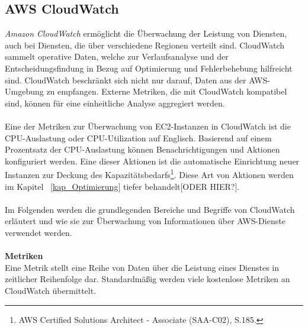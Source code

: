 \subsection{AWS CloudWatch}\label{ssec:CloudWatch}
\textit{Amazon CloudWatch} ermöglicht die Überwachung der Leistung von Diensten, auch bei Diensten, die über verschiedene Regionen verteilt sind. CloudWatch sammelt operative Daten, welche zur Verlaufsanalyse und der Entscheidungsfindung in Bezug auf Optimierung und Fehlerbehebung hilfreicht sind. CloudWatch beschränkt sich nicht nur darauf, Daten aus der AWS-Umgebung zu empfangen. Externe Metriken, die mit CloudWatch kompatibel sind, können für eine einheitliche Analyse aggregiert werden. 
\\\\
Eine der Metriken zur Überwachung von EC2-Instanzen in CloudWatch ist die CPU-Auslastung oder CPU-Utilization auf Englisch. Basierend auf einem Prozentsatz der CPU-Auslastung können Benachrichtigungen und Aktionen konfiguriert werden. Eine dieser Aktionen ist die automatische Einrichtung neuer Instanzen zur Deckung des Kapazitätsbedarfs\footnote{AWS Certified Solutions Architect - Associate (SAA-C02), S.185.\cite{AWS1}}. Diese Art von Aktionen werden im Kapitel ~\ref{kap_Optimierung} tiefer behandelt[ODER HIER?].
\\\\
Im Folgenden werden die grundlegenden Bereiche und Begriffe von CloudWatch erläutert und wie sie zur Überwachung von Informationen über AWS-Dienste verwendet werden.
\\\\
\textbf{Metriken} \\
Eine Metrik stellt eine Reihe von Daten über die Leistung eines Dienstes in zeitlicher Reihenfolge dar. Standardmäßig werden viele kostenlose Metriken an CloudWatch übermittelt.

